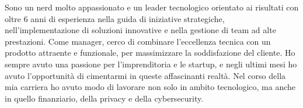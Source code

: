 
\begin{cvparagraph}
    Sono un nerd molto appassionato e un leader tecnologico orientato ai risultati con oltre 6 anni di esperienza nella guida di iniziative strategiche, nell'implementazione di soluzioni innovative e nella gestione di team ad alte prestazioni.
    Come manager, cerco di combinare l'eccellenza tecnica con un prodotto attraente e funzionale, per massimizzare la soddisfazione del cliente.
    Ho sempre avuto una passione per l'imprenditoria e le startup, e negli ultimi mesi ho avuto l'opportunità di cimentarmi in queste affascinanti realtà.
    Nel corso della mia carriera ho avuto modo di lavorare non solo in ambito tecnologico, ma anche in quello finanziario, della privacy e della cybersecurity.
\end{cvparagraph}